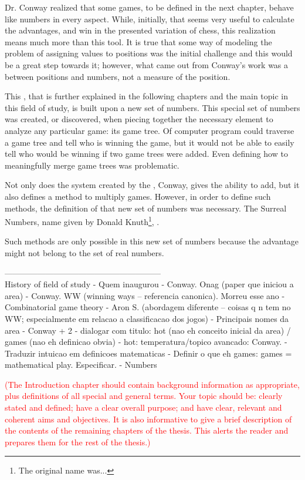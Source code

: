 Dr. Conway realized that some games, to be defined in the next chapter, behave like numbers in every aspect. While, initially, that seems very useful to calculate the advantages, and win in the presented variation of chess, this realization means much more than this tool. It is true that some way of modeling the problem of assigning values to positions was the initial challenge and this would be a great step towards it; however, what came out from Conway's work was a  between positions and numbers, not a measure of the position.

This , that is further explained in the following chapters and the main topic in this field of study, is built upon a new set of numbers. This special set of numbers was created, or discovered, when piecing together the necessary element to analyze any particular game: its game tree. Of computer program could traverse a game tree and tell who is winning the game, but it would not be able to easily tell who would be winning if two game trees were added.  Even defining how to meaningfully merge game trees was problematic.

Not only does the system created by the , Conway, gives the ability to add, but it also defines a method to multiply games. However, in order to define such methods, the definition of that new set of numbers was necessary. The Surreal Numbers, name given by Donald Knuth\footnote{The original name was...}, .

Such methods are only possible in this new set of numbers because the advantage might not belong to the set of real numbers.

---------------------------------------------------------\\
History of field of study
- Quem inaugurou
-  Conway. Onag (paper que iniciou a area)
- Conway. WW (winning ways – referencia canonica). Morreu esse ano
- Combinatorial game theory
- Aron S. (abordagem diferente – coisas q n  tem no WW; especialmente em relacao a classificacao dos jogos)
- Principais nomes da area
- Conway + 2 
- dialogar com titulo: hot (nao eh conceito inicial da area) / games (nao eh definicao obvia)
- hot: temperatura/topico avancado: Conway.
- Traduzir intuicao em definicoes matematicas
- Definir o que eh games: games = mathematical play. Especificar.
- Numbers

\textcolor{red}{(The Introduction chapter should contain background information as appropriate, plus definitions of all special and general terms. Your topic should be: clearly stated and defined; have a clear overall purpose; and have clear, relevant and coherent aims and objectives. It is also informative to give a brief description of the contents of the remaining chapters of the thesis. This alerts the reader and prepares them for the rest of the thesis.)}


